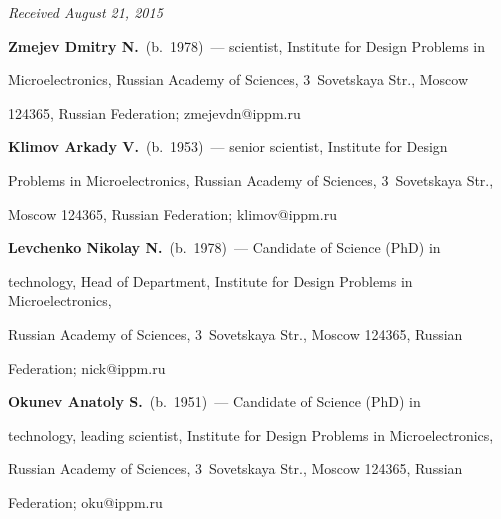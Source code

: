 \vspace*{-3pt}



\hfill{\small\textit{Received August 21, 2015}}

  

  \Contr

  

  \noindent

\textbf{Zmejev Dmitry N.}\ (b.\ 1978)~--- scientist, Institute for Design Problems in 

Microelectronics, Russian Academy of Sciences, 3~Sovetskaya Str., Moscow 

124365, Russian Federation; zmejevdn@ippm.ru



\vspace*{3pt}



\noindent

\textbf{Klimov Arkady V.}\ (b.\ 1953)~--- senior scientist, Institute for Design 

Problems in Microelectronics, Russian Academy of Sciences, 3~Sovetskaya Str., 

Moscow 124365, Russian Federation; klimov@ippm.ru



\vspace*{3pt}



\noindent

\textbf{Levchenko Nikolay N.}\ (b.\ 1978)~--- Candidate of Science (PhD) in 

technology, Head of Department, Institute for Design Problems in Microelectronics, 

Russian Academy of Sciences, 3~Sovetskaya Str., Moscow 124365, Russian 

Federation; nick@ippm.ru



\vspace*{3pt}



\noindent

\textbf{Okunev Anatoly S.}\ (b.\ 1951)~--- Candidate of Science (PhD) in 

technology, leading scientist, Institute for Design Problems in Microelectronics, 

Russian Academy of Sciences, 3~Sovetskaya Str., Moscow 124365, Russian 

Federation; oku@ippm.ru



